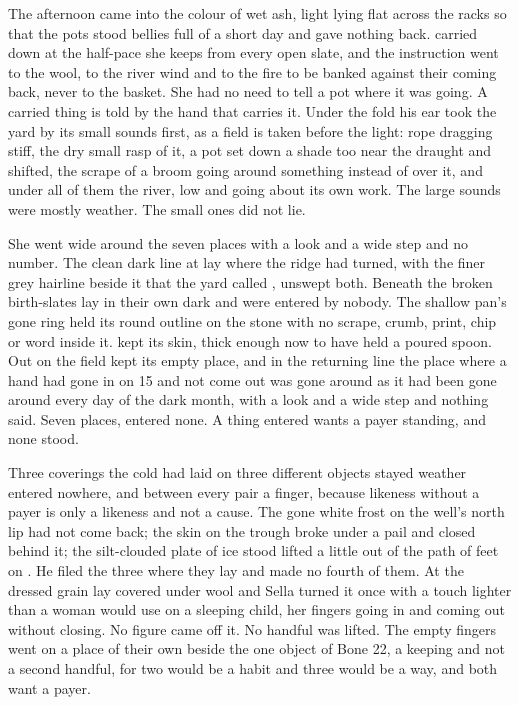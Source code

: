 The afternoon came into  the colour of wet ash, light lying flat across the racks so that the pots stood bellies full of a short day and gave nothing back.  carried  down at the half-pace she keeps from every open slate, and the instruction went to the wool, to the river wind and to the fire to be banked against their coming back, never to the basket. She had no need to tell a pot where it was going. A carried thing is told by the hand that carries it. Under the fold his ear took the yard by its small sounds first, as a field is taken before the light: rope dragging stiff, the dry small rasp of it, a pot set down a shade too near the draught and shifted, the scrape of a broom going around something instead of over it, and under all of them the river, low and going about its own work. The large sounds were mostly weather. The small ones did not lie.

She went wide around the seven places with a look and a wide step and no number. The clean dark line at  lay where the  ridge had turned, with the finer grey hairline beside it that the yard called , unswept both. Beneath  the broken birth-slates lay in their own dark and were entered by nobody. The shallow pan's gone ring held its round outline on the stone with no scrape, crumb, print, chip or word inside it.  kept its skin, thick enough now to have held a poured spoon. Out on  the field kept its empty place, and in the returning line the place where a hand had gone in on  15 and not come out was gone around as it had been gone around every day of the dark month, with a look and a wide step and nothing said. Seven places, entered none. A thing entered wants a payer standing, and none stood.

Three coverings the cold had laid on three different objects stayed weather entered nowhere, and between every pair a finger, because likeness without a payer is only a likeness and not a cause. The gone white frost on the well's north lip had not come back; the skin on the trough broke under a pail and closed behind it; the silt-clouded plate of ice stood lifted a little out of the path of feet on . He filed the three where they lay and made no fourth of them. At  the dressed grain lay covered under wool and Sella turned it once with a touch lighter than a woman would use on a sleeping child, her fingers going in and coming out without closing. No figure came off it. No handful was lifted. The empty fingers went on a place of their own beside the one object of Bone 22, a keeping and not a second handful, for two would be a habit and three would be a way, and both want a payer.

